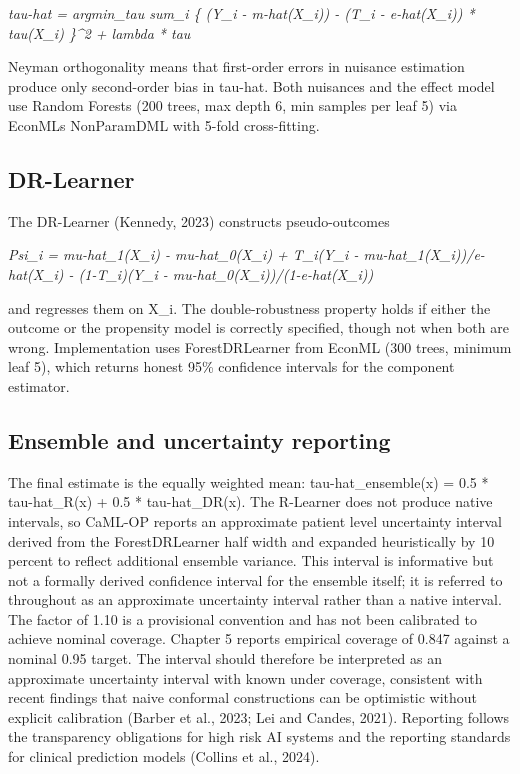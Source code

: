 \emph{tau-hat = argmin\_tau sum\_i \{ (Y\_i - m-hat(X\_i)) - (T\_i - e-hat(X\_i)) * tau(X\_i) \}\^{}2 + lambda * \textbar\textbar tau\textbar\textbar{}}

Neyman orthogonality means that first-order errors in nuisance estimation produce only second-order bias in tau-hat. Both nuisances and the effect model use Random Forests (200 trees, max depth 6, min samples per leaf 5) via EconML\textquotesingle s NonParamDML with 5-fold cross-fitting.

\subsection{DR-Learner}\label{dr-learner}

The DR-Learner (Kennedy, 2023) constructs pseudo-outcomes

\emph{Psi\_i = mu-hat\_1(X\_i) - mu-hat\_0(X\_i) + T\_i(Y\_i - mu-hat\_1(X\_i))/e-hat(X\_i) - (1-T\_i)(Y\_i - mu-hat\_0(X\_i))/(1-e-hat(X\_i))}

and regresses them on X\_i. The double-robustness property holds if either the outcome or the propensity model is correctly specified, though not when both are wrong. Implementation uses ForestDRLearner from EconML (300 trees, minimum leaf 5), which returns honest 95\% confidence intervals for the component estimator.

\subsection{Ensemble and uncertainty reporting}\label{ensemble-and-uncertainty-reporting}

The final estimate is the equally weighted mean: tau-hat\_ensemble(x) = 0.5 * tau-hat\_R(x) + 0.5 * tau-hat\_DR(x). The R-Learner does not produce native intervals, so CaML-OP reports an approximate patient level uncertainty interval derived from the ForestDRLearner half width and expanded heuristically by 10 percent to reflect additional ensemble variance. This interval is informative but not a formally derived confidence interval for the ensemble itself; it is referred to throughout as an approximate uncertainty interval rather than a native interval. The factor of 1.10 is a provisional convention and has not been calibrated to achieve nominal coverage. Chapter 5 reports empirical coverage of 0.847 against a nominal 0.95 target. The interval should therefore be interpreted as an approximate uncertainty interval with known under coverage, consistent with recent findings that naive conformal constructions can be optimistic without explicit calibration (Barber et al., 2023; Lei and Candes, 2021). Reporting follows the transparency obligations for high risk AI systems and the reporting standards for clinical prediction models (Collins et al., 2024).

